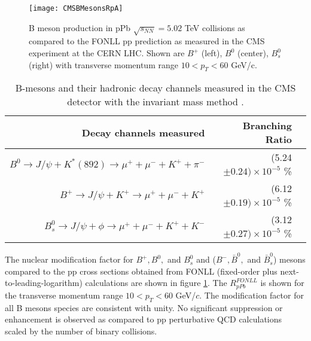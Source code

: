 \begin{figure}[h]
  \centering
  \texttt{[image: CMSBMesonsRpA]}\\
  \caption{B meson production in pPb $\sqrt{s_{NN}} = 5.02$ TeV collisions as compared to the FONLL pp prediction as measured \cite{Khachatryan:2015uja} in the CMS experiment at the CERN LHC. Shown are $B^{+}$ (left), $B^{0}$ (center), $B^{0}_{s}$ (right) with transverse momentum range $10 < p_{T} < 60$ GeV/c.}\label{fig:CMSBMesonsRpA}
\end{figure}

\begin{table}[h]
  \begin{center}
    \caption{B-mesons and their hadronic decay channels measured in the CMS detector with the invariant mass method \cite{Khachatryan:2015uja}.}
    \label{tab:CMSInvMassHadronicDecays}
    \begin{tabular}{|r|r|l|}
    \hline
    Decay channels measured & Branching Ratio\\
    \hline
    \rule{0pt}{2.2ex} \rule[-1.1ex]{0pt}{0pt}    $B^{0} \to J/\psi + K^{\ast}(892) \to \mu^{+} + \mu^{-} + K^{+} + \pi^{-}$ & (5.24$\pm 0.24) \times 10^{-5}$ \% \\
   \hline
    \rule{0pt}{2.2ex} \rule[-1.6ex]{0pt}{0pt}  $B^{+} \to J/\psi + K^{+} \to \mu^{+} + \mu^{-} + K^{+}$ & (6.12$\pm 0.19) \times 10^{-5}$ \% \\
       \hline
    \rule{0pt}{2.2ex} \rule[-1.6ex]{0pt}{0pt}  $B^{0}_{s} \to J/\psi + \phi \to \mu^{+} + \mu^{-} + K^{+} + K^{-} $ & (3.12$\pm 0.27) \times 10^{-5}$ \% \\
    \hline
    \end{tabular}
  \end{center}
\end{table}


The nuclear modification factor for $B^{+}, B^{0},$ and  $B^{0}_{s}$ and ($B^{-}, \bar B^{0},$ and  $\bar B^{0}_{s}$) mesons compared to the pp cross sections obtained from FONLL (fixed-order plus next-to-leading-logarithm) calculations are shown in figure \ref{fig:CMSBMesonsRpA}. The $R_{pPb}^{FONLL}$ is shown for the transverse momentum range $10 < p_{T} < 60$ GeV/$c$. The modification factor for all B mesons species are consistent with unity. No significant suppression or enhancement is observed as compared to pp perturbative QCD calculations scaled by the number of binary collisions. 



